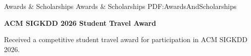 \Section
{Awards \&\newline
Scholarships}
{Awards \& Scholarships}
{PDF:AwardsAndScholarships}


\BulletItem
\textbf{ACM SIGKDD 2026 Student Travel Award}
\hfill
{}
\begin{Detail}
\Item
Received a competitive student travel award for participation in ACM SIGKDD 2026.
\end{Detail}

